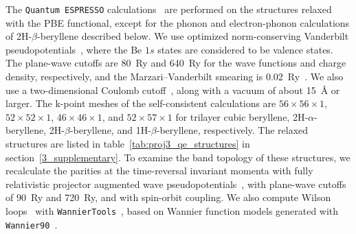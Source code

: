 The \texttt{Quantum ESPRESSO} calculations~\cite{giannozzi2017advanced,giannozzi2009quantum} are performed on the structures relaxed with the PBE functional,
except for the phonon and electron-phonon calculations of 2H-$\beta$-beryllene described below.
We use optimized norm-conserving Vanderbilt pseudopotentials~\cite{hamann2013optimized},
where the Be $1s$ states are considered to be valence states.
The plane-wave cutoffs are \qty{80}{Ry} and \qty{640}{Ry} for the wave functions and charge density, respectively,
and the Marzari--Vanderbilt smearing is \qty{0.02}{Ry}~\cite{marzari1999thermal}.
We also use a two-dimensional Coulomb cutoff~\cite{sohier2017density},
along with a vacuum of about \qty{15}{\angstrom} or larger.
The k-point meshes of the self-consistent calculations are $56 \times 56 \times 1$,
$52 \times 52 \times 1$, $46 \times 46 \times 1$,
and $52 \times 57 \times 1$ for trilayer cubic beryllene,
2H-$\alpha$-beryllene,
2H-$\beta$-beryllene,
and 1H-$\beta$-beryllene,
respectively.
The relaxed structures are listed in table~\ref{tab:proj3_qe_structures} in section~\ref{3_supplementary}.
To examine the band topology of these structures,
we recalculate the parities at the time-reversal invariant momenta with fully relativistic projector augmented wave pseudopotentials~\cite{dalcorso2014pseudopotentials},
with plane-wave cutoffs of \qty{90}{Ry} and \qty{720}{Ry},
and with spin-orbit coupling.
We also compute Wilson loops~\cite{yu2011equivalent} with \texttt{WannierTools}~\cite{wu2018wanniertools},
based on Wannier function models generated with \texttt{Wannier90}~\cite{pizzi2020wannier90}.

